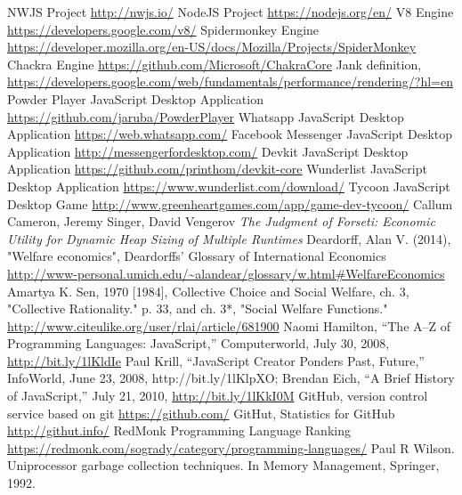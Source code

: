 \documentclass{l4proj}
\begin{document}
\begin{thebibliography}{9}
NWJS Project
\url{http://nwjs.io/}
NodeJS Project
\url{https://nodejs.org/en/}
V8 Engine
\url{https://developers.google.com/v8/}
Spidermonkey Engine
\url{https://developer.mozilla.org/en-US/docs/Mozilla/Projects/SpiderMonkey}
Chackra Engine
\url{https://github.com/Microsoft/ChakraCore}
Jank definition,
\url{https://developers.google.com/web/fundamentals/performance/rendering/?hl=en}
Powder Player JavaScript Desktop Application
\url{https://github.com/jaruba/PowderPlayer}
Whatsapp JavaScript Desktop Application
\url{https://web.whatsapp.com/}
Facebook Messenger JavaScript Desktop Application
\url{http://messengerfordesktop.com/}
Devkit JavaScript Desktop Application
\url{https://github.com/printhom/devkit-core}
Wunderlist JavaScript Desktop Application
\url{https://www.wunderlist.com/download/}
Tycoon JavaScript Desktop Game
\url{http://www.greenheartgames.com/app/game-dev-tycoon/}
Callum Cameron, Jeremy Singer, David Vengerov
\emph{The Judgment of Forseti: Economic Utility for Dynamic Heap Sizing of Multiple Runtimes}
Deardorff, Alan V. (2014), "Welfare economics", Deardorffs' Glossary of International Economics \url{http://www-personal.umich.edu/~alandear/glossary/w.html#WelfareEconomics}
Amartya K. Sen, 1970 [1984], Collective Choice and Social Welfare, ch. 3, "Collective Rationality." p. 33, and ch. 3*, "Social Welfare Functions." \url{http://www.citeulike.org/user/rlai/article/681900}
Naomi Hamilton, “The A–Z of Programming Languages: JavaScript,” Computerworld, July 30, 2008, \url{http://bit.ly/1lKldIe}
 Paul Krill, “JavaScript Creator Ponders Past, Future,” InfoWorld, June 23, 2008, http://bit.ly/1lKlpXO; Brendan Eich, “A Brief History of JavaScript,” July 21, 2010, \url{http://bit.ly/1lKkI0M}
GitHub, version control service based on git \hspace*{1em} \url{https://github.com/}
GitHut, Statistics for GitHub \hspace*{1em} \url{http://githut.info/}
RedMonk Programming Language Ranking
\url{https://redmonk.com/sogrady/category/programming-languages/}
Paul R Wilson. Uniprocessor garbage collection techniques. In Memory Management, Springer, 1992.

\end{thebibliography}
\end{document}

